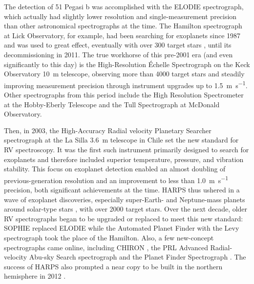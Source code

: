 The detection of 51 Pegasi b was accomplished with the ELODIE spectrograph\linebreak \citep{baranne_elodie_1996}, which actually had slightly lower resolution and single-measure\-ment precision than other astronomical spectrographs at the time. The Hamilton spectrograph \citep{vogt_lick_1987} at Lick Observatory, for example, had been searching for exoplanets since 1987 and was used to great effect, eventually with over 300 target stars \citep{fischer_planetary_1999}, until its decommissioning in 2011. The true workhorse of this pre-2001 era (and even significantly to this day) is the High-Resolution \'Echelle Spectrograph \citep[HIRES;][]{vogt_hires_1994} on the Keck Observatory 10~m telescope, observing more than 4000 target stars and steadily improving measurement precision through instrument upgrades up to 1.5~\si{\meter\per\second}. Other spectrographs from this period include the High Resolution Spectrometer \citep[HRS;][]{tull_high-resolution_1998} at the Hobby-Eberly Telescope and the Tull Spectrograph \citep{tull_high-resolution_1995} at McDonald Observatory.

Then, in 2003, the High-Accuracy Radial velocity Planetary Searcher spectrograph \citep[HARPS;][]{pepe_harps_2002, mayor_setting_2003} at the La Silla 3.6~m telescope in Chile set the new standard for RV spectroscopy. It was the first such instrument primarily designed to search for exoplanets and therefore included superior temperature, pressure, and vibration stability. This focus on exoplanet detection enabled an almost doubling of previous-generation resolution and an improvement to less than 1.0~\si{\meter\per\second} precision, both significant achievements at the time. HARPS thus ushered in a wave of exoplanet discoveries, especially super-Earth- and Neptune-mass planets around solar-type stars \citep{pepe_harps_2011}, with over 2000 target stars. Over the next decade, older RV spectrographs began to be upgraded or replaced to meet this new standard: SOPHIE \citep{perruchot_sophie_2008} replaced ELODIE while the Automated Planet Finder with the Levy spectrograph \citep[APF+Levy;][]{vogt_apflick_2014} took the place of the Hamilton. Also, a few new-concept spectrographs came online, including CHIRON \citep{tokovinin_chironfiber_2013}, the PRL Advanced Radial-velocity Abu-sky Search spectrograph \citep[PARAS;][]{chakraborty_first_2010, chakraborty_prl_2014} and the Planet Finder Spectrograph \citep[PFS;][]{crane_carnegie_2006}. The success of HARPS also prompted a near copy to be built in the northern hemisphere in 2012 \citep[HARPS-N;][]{cosentino_harps-n_2014}.

